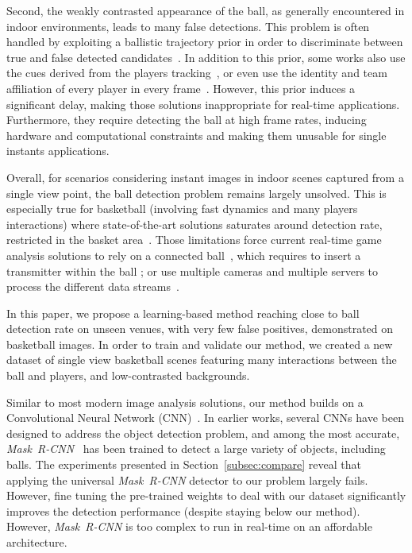\documentclass[sigconf, screen]{acmart}
\begin{document}
Second, the weakly contrasted appearance of the ball, as generally encountered in indoor environments, leads to many false detections. This problem is often handled by exploiting a ballistic trajectory prior in order to discriminate between true and false detected candidates~\cite{Chen2008, Chen2012, Chakraborty2013, Kumar2011, Zhou2013, Yan2006, Parisot2011}.
In addition to this prior, some works also use the cues derived from the players tracking~\cite{Zhang2008, Maksai2016}, or even use the identity and team affiliation of every player in every frame~\cite{Wei2016}.
However, this prior induces a significant delay, making those solutions inappropriate for real-time applications. Furthermore, they require detecting the ball at high frame rates, inducing hardware and computational constraints and making them unusable for single instants applications.

Overall, for scenarios considering instant images in indoor scenes captured from a single view point, the ball detection problem remains largely unsolved. This is especially true for basketball (involving fast dynamics and many players interactions) where state-of-the-art solutions saturates around  detection rate, restricted in the basket area~\cite{Parisot2019b}.
Those limitations force current real-time game analysis solutions to rely on a connected ball~\cite{youtube}, which requires to insert a transmitter within the ball ; or use multiple cameras and multiple servers to process the different data streams~\cite{HawkEye, Pingali2000, intelTrueView}.

\smallskip

In this paper, we propose a learning-based method reaching close to  ball detection rate on unseen venues, with very few false positives, demonstrated on basketball images. In order to train and validate our method, we created a new dataset of single view basketball scenes featuring many interactions between the ball and players, and low-contrasted backgrounds.

\smallskip


Similar to most modern image analysis solutions, our method builds on a Convolutional Neural Network (CNN)~\cite{Lecun2015a}.
In earlier works, several CNNs have been designed to address the object detection problem, and among the most accurate, \emph{Mask~R-CNN}~\cite{He2017} has been trained to detect a large variety of objects, including balls.
The experiments presented in Section~\ref{subsec:compare} reveal that applying the universal \emph{Mask~R-CNN} detector to our problem largely fails. However, fine tuning the pre-trained weights to deal with our dataset significantly improves the detection performance (despite staying  below our method). However, \emph{Mask~R-CNN} is too complex to run in real-time on an affordable architecture.
\end{document}

